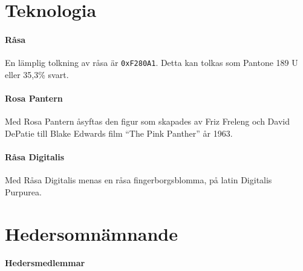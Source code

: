 \documentclass{dsekregulations}
\begin{document}
\maketitle
\section{Teknologia}

\paragraph{Råsa}
En lämplig tolkning av råsa är \texttt{0xF280A1}. Detta kan tolkas som Pantone
189 U eller 35,3\% svart.

\paragraph{Rosa Pantern} Med Rosa Pantern åsyftas den figur som skapades av
Friz Freleng och David DePatie till Blake Edwards film ``The Pink Panther'' år
1963.

\paragraph{Råsa Digitalis} Med Råsa Digitalis menas en råsa fingerborgsblomma,
på latin Digitalis Purpurea.

\section{Hedersomnämnande}

\paragraph{Hedersmedlemmar}
\end{document}
